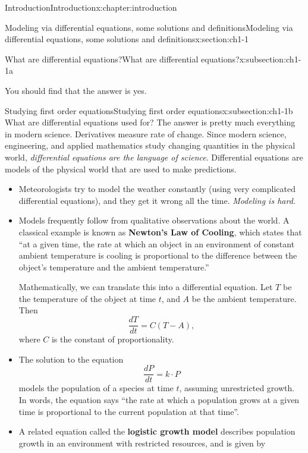 \documentclass[oneside,10pt,]{book}
\newcommand{\terminology}[1]{\textbf{#1}}
\numberwithin{equation}{section}
\numberwithin{equation}{section}
\begin{document}
\begin{chapterptx}{Introduction}{}{Introduction}{}{}{x:chapter:introduction}
\begin{sectionptx}{Modeling via differential equations, some solutions and definitions}{}{Modeling via differential equations, some solutions and definitions}{}{}{x:section:ch1-1}
\begin{subsectionptx}{What are differential equations?}{}{What are differential equations?}{}{}{x:subsection:ch1-1a}
\begin{itemize}[label=\textbullet]
\begin{itemize}[label=$\circ$]
You should find that the answer is yes.%
\end{itemize}
%
\end{itemize}
\end{subsectionptx}
%
%
\typeout{************************************************}
\typeout{************************************************}
%
\begin{subsectionptx}{Studying first order equations}{}{Studying first order equations}{}{}{x:subsection:ch1-1b}
What are differential equations used for? The answer is pretty much everything in modern science. Derivatives measure rate of change. Since modern science, engineering, and applied mathematics study changing quantities in the physical world, \emph{differential equations are the language of science}. Differential equations are models of the physical world that are used to make predictions.%
%
\begin{itemize}[label=\textbullet]
\item{}Meteorologists try to model the weather constantly (using very complicated differential equations), and they get it wrong all the time. \emph{Modeling is hard.}%
\item{}Models frequently follow from qualitative observations about the world. A classical example is known as \terminology{Newton's Law of Cooling}, which states that ``at a given time, the rate at which an object in an environment of constant ambient temperature is cooling is proportional to the difference between the object's temperature and the ambient temperature.''%
\par
Mathematically, we can translate this into a differential equation. Let \(T\) be the temperature of the object at time \(t\), and \(A\) be the ambient temperature. Then%
\begin{equation*}
\frac{dT}{dt} = C(T - A),
\end{equation*}
where \(C\) is the constant of proportionality.%
\item{}The solution to the equation%
\begin{equation*}
\frac{dP}{dt} = k\cdot P
\end{equation*}
models the population of a species at time \(t\), assuming unrestricted growth. In words, the equation says ``the rate at which a population grows at a given time is proportional to the current population at that time''.%
\item{}A related equation called the \terminology{logistic growth model} describes population growth in an environment with restricted resources, and is given by%

\end{itemize}
\end{subsectionptx}
\end{sectionptx}
\end{chapterptx}
\end{document}
